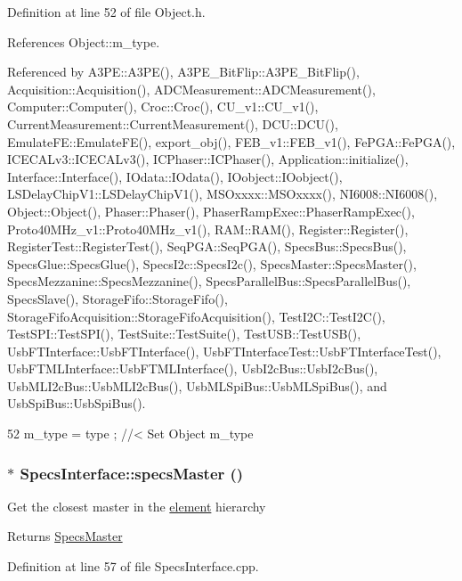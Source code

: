 Definition at line 52 of file Object.h.

References Object::m\_\-type.

Referenced by A3PE::A3PE(), A3PE\_\-BitFlip::A3PE\_\-BitFlip(), Acquisition::Acquisition(), ADCMeasurement::ADCMeasurement(), Computer::Computer(), Croc::Croc(), CU\_\-v1::CU\_\-v1(), CurrentMeasurement::CurrentMeasurement(), DCU::DCU(), EmulateFE::EmulateFE(), export\_\-obj(), FEB\_\-v1::FEB\_\-v1(), FePGA::FePGA(), ICECALv3::ICECALv3(), ICPhaser::ICPhaser(), Application::initialize(), Interface::Interface(), IOdata::IOdata(), IOobject::IOobject(), LSDelayChipV1::LSDelayChipV1(), MSOxxxx::MSOxxxx(), NI6008::NI6008(), Object::Object(), Phaser::Phaser(), PhaserRampExec::PhaserRampExec(), Proto40MHz\_\-v1::Proto40MHz\_\-v1(), RAM::RAM(), Register::Register(), RegisterTest::RegisterTest(), SeqPGA::SeqPGA(), SpecsBus::SpecsBus(), SpecsGlue::SpecsGlue(), SpecsI2c::SpecsI2c(), SpecsMaster::SpecsMaster(), SpecsMezzanine::SpecsMezzanine(), SpecsParallelBus::SpecsParallelBus(), SpecsSlave(), StorageFifo::StorageFifo(), StorageFifoAcquisition::StorageFifoAcquisition(), TestI2C::TestI2C(), TestSPI::TestSPI(), TestSuite::TestSuite(), TestUSB::TestUSB(), UsbFTInterface::UsbFTInterface(), UsbFTInterfaceTest::UsbFTInterfaceTest(), UsbFTMLInterface::UsbFTMLInterface(), UsbI2cBus::UsbI2cBus(), UsbMLI2cBus::UsbMLI2cBus(), UsbMLSpiBus::UsbMLSpiBus(), and UsbSpiBus::UsbSpiBus().


\begin{DoxyCode}
52 { m_type  = type  ; } //< Set Object m_type
\end{DoxyCode}
\hypertarget{classSpecsInterface_a3d497c965fb6ec06b49a54b7901a22b2}{
\subsubsection[{specsMaster}]{ $\ast$ SpecsInterface::specsMaster ()}}
\label{classSpecsInterface_a3d497c965fb6ec06b49a54b7901a22b2}
Get the closest master in the \hyperlink{namespaceelement}{element} hierarchy \begin{DoxyReturn}{Returns}
\hyperlink{classSpecsMaster}{SpecsMaster} 
\end{DoxyReturn}


Definition at line 57 of file SpecsInterface.cpp.

